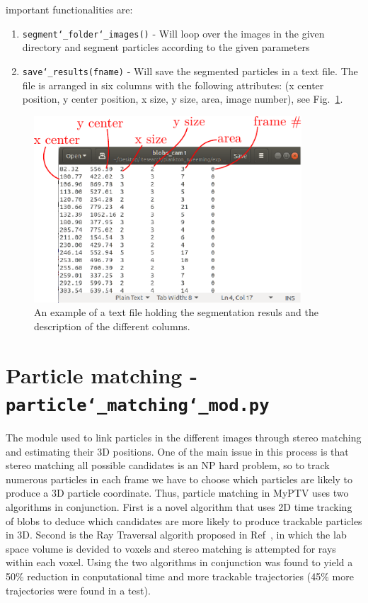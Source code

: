 \documentclass[10pt,a4paper]{article}
\begin{document}
important functionalities are:
%
\begin{enumerate}
	\item \texttt{segment\char`_folder\char`_images()} - Will loop over the images in the given directory and segment particles according to the given parameters
	\item \texttt{save\char`_results(fname)} - Will save the segmented particles in a text file. The file is arranged in six columns with the following attributes: (x center position, y center position, x size, y size, area, image number), see Fig.~\ref{fig:blobfile}.
\end{enumerate}

\begin{figure}[h!]
	\centering
	\includegraphics[width=10cm]{blob_file.pdf}
	\caption{An example of a text file holding the segmentation resuls and the description of the different columns. \label{fig:blobfile}} 
\end{figure}








\section{Particle matching - \texttt{particle\char`_matching\char`_mod.py}} \label{sec:matching}

The module used to link particles in the different images through stereo matching and estimating their 3D positions. One of the main issue in this process is that stereo matching all possible candidates is an NP hard problem, so to track numerous particles in each frame we have to choose which particles are likely to produce a 3D particle coordinate. Thus, particle matching in MyPTV uses two algorithms in conjunction. First is a novel algorithm that uses 2D time tracking of blobs to deduce which candidates are more likely to produce trackable particles in 3D. Second is the Ray Traversal algorith proposed in Ref~\cite{Bourgoin2020}, in which the lab space volume is devided to voxels and stereo matching is attempted for rays within each voxel. Using the two algorithms in conjunction was found to yield a 50\% reduction in conputational time and more trackable trajectories (45\% more trajectories were found in a test). 
\end{document}
